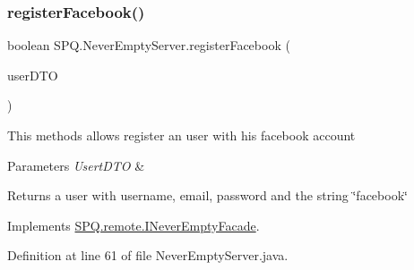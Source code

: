 \subsubsection{\texorpdfstring{register\+Facebook()}{registerFacebook()}}
{\footnotesize\ttfamily boolean S\+P\+Q.\+Never\+Empty\+Server.\+register\+Facebook (\begin{DoxyParamCaption}\item[{\mbox{\hyperlink{class_s_p_q_1_1dto_1_1_user_d_t_o}{User\+D\+TO}}}]{user\+D\+TO }\end{DoxyParamCaption})}

This methods allows register an user with his facebook account 
\begin{DoxyParams}{Parameters}
{\em Usert\+D\+TO} & \\
\hline
\end{DoxyParams}
\begin{DoxyReturn}{Returns}
a user with username, email, password and the string \char`\"{}facebook\char`\"{} 
\end{DoxyReturn}


Implements \mbox{\hyperlink{interface_s_p_q_1_1remote_1_1_i_never_empty_facade_a7b2f025522489fe9070d09a4fb08f0a1}{S\+P\+Q.\+remote.\+I\+Never\+Empty\+Facade}}.



Definition at line 61 of file Never\+Empty\+Server.\+java.

